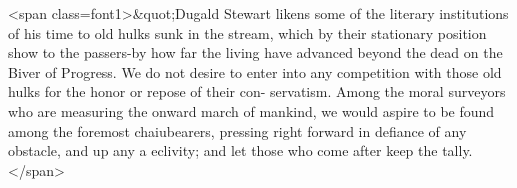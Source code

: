 <span class=font1>&quot;Dugald Stewart likens some of the literary institutions of his time
to old hulks sunk in the stream, which by their stationary position
show to the passers-by how far the living have advanced beyond the
dead on the Biver of Progress. We do not desire to enter into any
competition with those old hulks for the honor or repose of their con-
servatism. Among the moral surveyors who are measuring the onward
march of mankind, we would aspire to be found among the foremost
chaiubearers, pressing right forward in defiance of any obstacle, and
up any a eclivity; and let those who come after keep the tally.</span>\endinput
